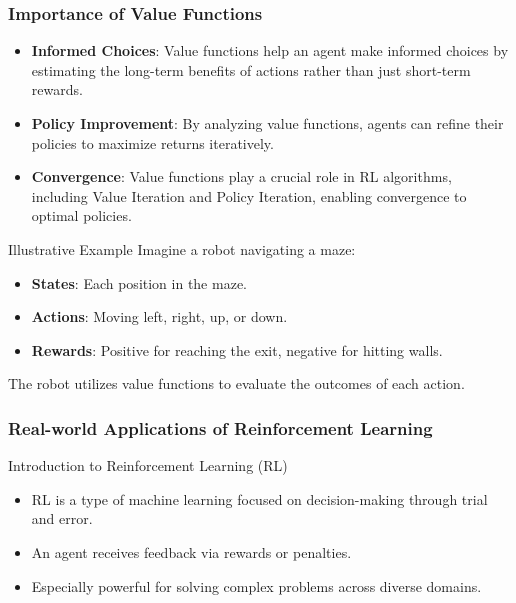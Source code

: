 \documentclass{beamer}
\begin{document}
\begin{frame}[fragile]
    \frametitle{Importance of Value Functions}
    \begin{itemize}
        \item \textbf{Informed Choices}: Value functions help an agent make informed choices by estimating the long-term benefits of actions rather than just short-term rewards.
        \item \textbf{Policy Improvement}: By analyzing value functions, agents can refine their policies to maximize returns iteratively.
        \item \textbf{Convergence}: Value functions play a crucial role in RL algorithms, including Value Iteration and Policy Iteration, enabling convergence to optimal policies.
    \end{itemize}
    
    \begin{block}{Illustrative Example}
        Imagine a robot navigating a maze:
        \begin{itemize}
            \item \textbf{States}: Each position in the maze.
            \item \textbf{Actions}: Moving left, right, up, or down.
            \item \textbf{Rewards}: Positive for reaching the exit, negative for hitting walls.
        \end{itemize}
        The robot utilizes value functions to evaluate the outcomes of each action.
    \end{block}
\end{frame}

\begin{frame}[fragile]
    \frametitle{Real-world Applications of Reinforcement Learning}
    \begin{block}{Introduction to Reinforcement Learning (RL)}
        \begin{itemize}
            \item RL is a type of machine learning focused on decision-making through trial and error.
            \item An agent receives feedback via rewards or penalties.
            \item Especially powerful for solving complex problems across diverse domains.
        \end{itemize}
    \end{block}
\end{frame}
\end{document}
